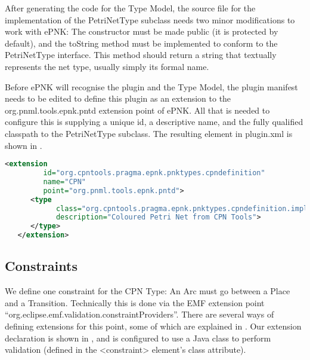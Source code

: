 After generating the code for the Type Model, the source file for
the implementation of the PetriNetType subclass needs two minor modifications
to work with ePNK: The constructor must be made public (it is protected by
default), and the toString method must be implemented to conform to the
PetriNetType interface. This method should return a string that textually
represents the net type, usually simply its formal name.

Before ePNK will recognise the plugin and the Type Model, the plugin manifest
needs to be edited to define this plugin as an extension to the
org.pnml.tools.epnk.pntd extension point of ePNK. All that is needed to
configure this is supplying a unique id, a descriptive name, and the fully
qualified classpath to the PetriNetType subclass. The resulting
element in plugin.xml is shown in . 

\begin{lstlisting}[language=XML,label=lst:pntd_xml,float,
caption=ePNK Petri Net Type Definition Extension]
   <extension
         id="org.cpntools.pragma.epnk.pnktypes.cpndefinition"
         name="CPN"
         point="org.pnml.tools.epnk.pntd">
      <type
            class="org.cpntools.pragma.epnk.pnktypes.cpndefinition.impl.CPNImpl"
            description="Coloured Petri Net from CPN Tools">
      </type>
   </extension> 
\end{lstlisting}

\subsection{Constraints}

We define one constraint for the CPN Type: An Arc must go between a Place and a
Transition. Technically this is done via the EMF extension point
``org.eclipse.emf.validation.constraintProviders''. There are several ways of
defining extensions for this point, some of which are explained in
\cite{kindler2011epnk}. Our extension declaration is shown in
, and is configured to use a Java class to perform
validation (defined in the \textless{}constraint\textgreater{} element's class
attribute).

